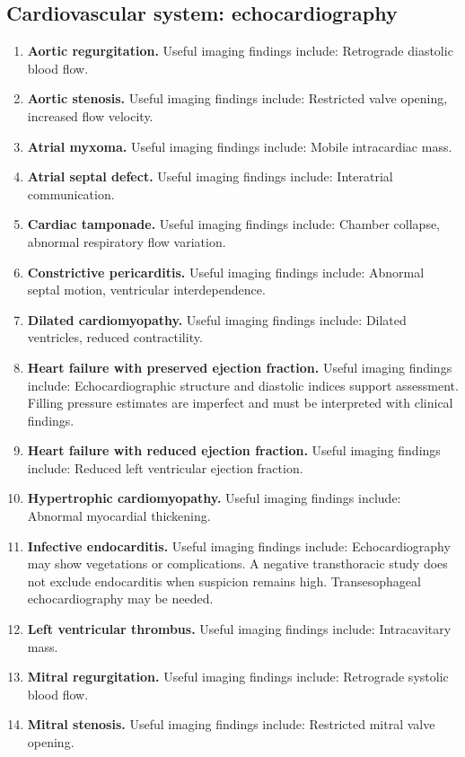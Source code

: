 \subsection{Cardiovascular system: echocardiography}
\begin{enumerate}[leftmargin=*,itemsep=0.45em,topsep=0.4em]
\item \textbf{Aortic regurgitation.} Useful imaging findings include: Retrograde diastolic blood flow.
\item \textbf{Aortic stenosis.} Useful imaging findings include: Restricted valve opening, increased flow velocity.
\item \textbf{Atrial myxoma.} Useful imaging findings include: Mobile intracardiac mass.
\item \textbf{Atrial septal defect.} Useful imaging findings include: Interatrial communication.
\item \textbf{Cardiac tamponade.} Useful imaging findings include: Chamber collapse, abnormal respiratory flow variation.
\item \textbf{Constrictive pericarditis.} Useful imaging findings include: Abnormal septal motion, ventricular interdependence.
\item \textbf{Dilated cardiomyopathy.} Useful imaging findings include: Dilated ventricles, reduced contractility.
\item \textbf{Heart failure with preserved ejection fraction.} Useful imaging findings include: Echocardiographic structure and diastolic indices support assessment. Filling pressure estimates are imperfect and must be interpreted with clinical findings.
\item \textbf{Heart failure with reduced ejection fraction.} Useful imaging findings include: Reduced left ventricular ejection fraction.
\item \textbf{Hypertrophic cardiomyopathy.} Useful imaging findings include: Abnormal myocardial thickening.
\item \textbf{Infective endocarditis.} Useful imaging findings include: Echocardiography may show vegetations or complications. A negative transthoracic study does not exclude endocarditis when suspicion remains high. Transesophageal echocardiography may be needed.
\item \textbf{Left ventricular thrombus.} Useful imaging findings include: Intracavitary mass.
\item \textbf{Mitral regurgitation.} Useful imaging findings include: Retrograde systolic blood flow.
\item \textbf{Mitral stenosis.} Useful imaging findings include: Restricted mitral valve opening.

\end{enumerate}
